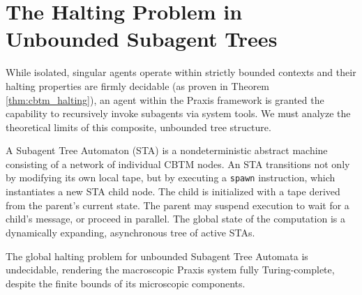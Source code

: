 \section{The Halting Problem in Unbounded Subagent Trees}

While isolated, singular agents operate within strictly bounded contexts and their halting properties are firmly decidable (as proven in Theorem \ref{thm:cbtm_halting}), an agent within the Praxis framework is granted the capability to recursively invoke subagents via system tools. We must analyze the theoretical limits of this composite, unbounded tree structure.

\begin{definition}
A Subagent Tree Automaton (STA) is a nondeterministic abstract machine consisting of a network of individual CBTM nodes. An STA transitions not only by modifying its own local tape, but by executing a \texttt{spawn} instruction, which instantiates a new STA child node. The child is initialized with a tape derived from the parent's current state. The parent may suspend execution to wait for a child's message, or proceed in parallel. The global state of the computation is a dynamically expanding, asynchronous tree of active STAs.
\end{definition}

\begin{theorem}
\label{thm:sta_halting}
The global halting problem for unbounded Subagent Tree Automata is undecidable, rendering the macroscopic Praxis system fully Turing-complete, despite the finite bounds of its microscopic components.
\end{theorem}

